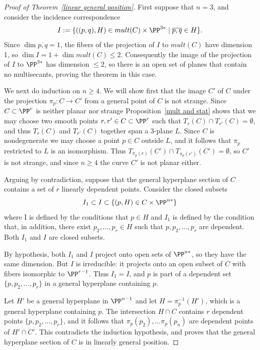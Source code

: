 \begin{proof}[Proof of Theorem~\ref{linear general position}]
First suppose that $n=3$, and consider the incidence correspondence
$$
I := \{ ((p,q), H) \in mult(C) \times \PP^{3*} \mid \overline{p,q}\in H\}.
$$
Since $\dim \overline{p,q} = 1$, the fibers of the projection of $I$ to $mult(C)$ have dimension 1,
so $\dim I = 1+\dim mult(C)  \leq 2$. Consequently the image of  the projection of $I$ to $\PP^{3*}$ has
dimension $\leq 2$, so there is an open set of planes that contain no multisecants, proving the theorem in this case.

We next do induction on $n\geq 4$. We will show first that the image $C'$ of
$C$ under the projection $\pi_p: C\to C'$ from a general point of $C$ is not strange. Since $C\subset \PP^r$ is neither
planar nor strange
Proposition~\ref{mult and stat} shows that we may choose two smooth points
$r,r'\in C\subset \PP^r$ such that $T_r(C)\cap T_{r'}(C) = \emptyset$, and thus 
$T_r(C)$ and $T_{r'}(C)$ together span a 3-plane $L$. Since $C$ is nondegenerate we may
choose a point $p\in C$ outside $L$, and it follows that $\pi_p$ restricted to $L$ is an isomorphism.
Thus $T_{\pi_p(r)}(C') \cap T_{\pi_p({r'})}(C') = \emptyset$, so $C'$ is not strange, 
and since $n\geq 4$ the curve $C'$ is not planar either.

Arguing by contradiction, suppose that the general hyperplane section of $C$ contains a set of $r$ linearly dependent points. Consider the closed subsets  
$$
I_1 \subset I \subset \{(p,H) \in C \times \PP^{n*}\}
$$
where I is defined by the conditions that $p\in H$ and $I_1$ is defined by the condition that, in addition, there exist $p_2,\dots, p_r\in H$
such that $p, p_2, \dots, p_r$ are dependent. Both $I_1$ and $I$ are closed subsets.

By hypothesis, both $I_1$ and $I$ project onto open sets of $\PP^{n*}$, so they have the same dimension.
But $I$ is irreducible: it projects onto an open subset of $C$ with fibers isomorphic to $\PP^{r-1}$. Thus $I_1 = I$,
and  $p$ is part of a dependent set
$\{p, p_2,\dots, p_r\}$ in a general hyperplane containing $p$.

Let $H'$ be a general hyperplane in $\PP^{n-1}$
and let $H = \pi_p^{-1}(H')$, which is a general hyperplane containing $p$. The intersection $H\cap C$
contains $r$ dependent points $\{p, p_2,\dots, p_r\}$, and it follows that $\pi_p(p_2),\dots \pi_p(p_n)$
are dependent points of $H'\cap C'$. This contradicts the induction hypothesis, and proves that
the general hyperplane section of $C$ is in linearly general position.
\end{proof}
 
